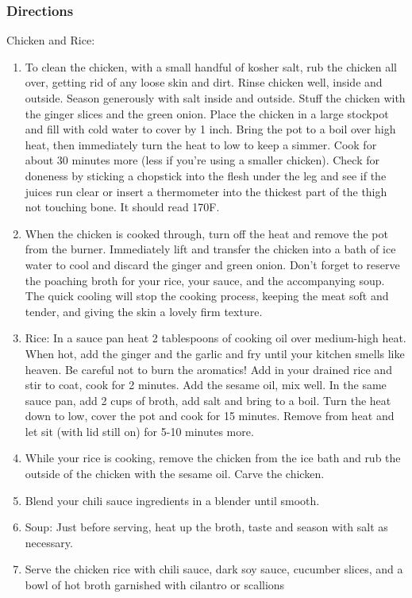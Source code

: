 \subsubsection*{Directions}
Chicken and Rice:
\begin{enumerate}
\item To clean the chicken, with a small handful of kosher salt, rub the chicken all over, getting rid of any loose skin and dirt. Rinse chicken well, inside and outside. Season generously with salt inside and outside. Stuff the chicken with the ginger slices and the green onion. Place the chicken in a large stockpot and fill with cold water to cover by 1 inch. Bring the pot to a boil over high heat, then immediately turn the heat to low to keep a simmer. Cook for about 30 minutes more (less if you're using a smaller chicken). Check for doneness by sticking a chopstick into the flesh under the leg and see if the juices run clear or insert a thermometer into the thickest part of the thigh not touching bone. It should read 170F.

\item When the chicken is cooked through, turn off the heat and remove the pot from the burner. Immediately lift and transfer the chicken into a bath of ice water to cool and discard the ginger and green onion. Don't forget to reserve the poaching broth for your rice, your sauce, and the accompanying soup. The quick cooling will stop the cooking process, keeping the meat soft and tender, and giving the skin a lovely firm texture.

\item Rice: In a sauce pan heat 2 tablespoons of cooking oil over medium-high heat. When hot, add the ginger and the garlic and fry until your kitchen smells like heaven. Be careful not to burn the aromatics! Add in your drained rice and stir to coat, cook for 2 minutes. Add the sesame oil, mix well. In the same sauce pan, add 2 cups of broth, add salt and bring to a boil. Turn the heat down to low, cover the pot and cook for 15 minutes. Remove from heat and let sit (with lid still on) for 5-10 minutes more.

\item While your rice is cooking, remove the chicken from the ice bath and rub the outside of the chicken with the sesame oil. Carve the chicken.

\item Blend your chili sauce ingredients in a blender until smooth.

\item Soup: Just before serving, heat up the broth, taste and season with salt as necessary.

\item Serve the chicken rice with chili sauce, dark soy sauce, cucumber slices, and a bowl of hot broth garnished with cilantro or scallions
\end{enumerate}
